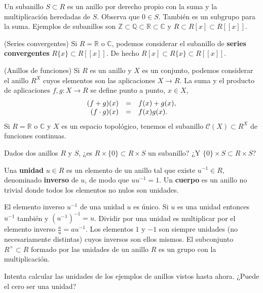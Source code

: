 
Un subanillo \(S\subset R\) es un anillo por derecho propio con la suma
y la multiplicación heredadas de \(S\). Observa que \(0\in S\). También
es un subgrupo para la suma. Ejemplos de subanillos son
\(\mathbb Z\subset \mathbb Q\subset \mathbb R\subset \mathbb C\) y
\(R\subset R[x]\subset R[[x]]\). 

\textrm{\normalfont (Series convergentes)} Si
\(R=\mathbb R\) o \(\mathbb C\), podemos considerar el subanillo de
\textbf{series convergentes} \(R\{x\}\subset R[[x]]\). De hecho
\(R[x]\subset R\{x\}\subset R[[x]]\). 

\textrm{\normalfont (Anillos de funciones)} Si \(R\) es
un anillo y \(X\) es un conjunto, podemos considerar el anillo \(R^X\)
cuyos elementos son las aplicaciones \(X\rightarrow R\). La suma y el
producto de aplicaciones \(f,g\colon X\rightarrow R\) se define punto a
punto, \(x\in X\),
\[\begin{array}{rcl}(f+g)(x)&=&f(x)+g(x),\cr (f\cdot g)(x)&=&f(x)g(x).\end{array}\]
Si \(R=\mathbb R\) o \(\mathbb C\) y \(X\) es un espacio topológico,
tenemos el subanillo \(\mathcal C(X)\subset R^X\) de funciones
continuas. 


Dados dos anillos \(R\) y \(S\), ¿es \(R\times\{0\}\subset R\times S\)
un subanillo? ¿Y \(\{0\}\times S\subset R\times S\)? 


Una \textbf{unidad} \(u\in R\) es un elemento de un anillo tal que
existe \(u^{-1}\in R\), denominado \textbf{inverso} de \(u\), de modo
que \(uu^{-1}=1\). Un \textbf{cuerpo} es un anillo no trivial donde
todos los elementos no nulos son unidades. 


El elemento inverso \(u^{-1}\) de una unidad \(u\) es único. Si \(u\) es
una unidad entonces \(u^{-1}\) también y \((u^{-1})^{-1}=u\). Dividir
por una unidad es multiplicar por el elemento inverso
\(\frac{a}{u}=au^{-1}\). Los elementos \(1\) y \(-1\) son siempre
unidades (no necesariamente distintas) cuyos inversos son ellos mismos.
El subconjunto \(R^{\times}\subset R\) formado por las unidades de un
anillo \(R\) es un grupo con la multiplicación. 


Intenta calcular las unidades de los ejemplos de anillos vistos hasta
ahora. ¿Puede el cero ser una unidad? 


